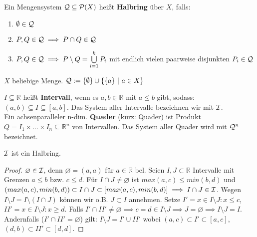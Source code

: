 \documentclass[11pt,a4paper,fleqn,openany]{report}
\begin{document}
    \begin{definition}
      Ein Mengensystem $\mathcal{Q} \subseteq \mathcal{P}(X)$ heißt \textbf{Halbring} über $X$, falls:
      \begin{enumerate}[label=\roman*)]
        \item $\emptyset \in \mathcal{Q}$
        \item $P, Q \in \mathcal{Q} \implies P \cap Q \in \mathcal{Q}$
        \item $P, Q \in \mathcal{Q} \implies P \setminus Q = \bigcup\limits_{i=1}^k P_i$ mit endlich vielen paarweise disjunkten $P_i \in \mathcal{Q}$
      \end{enumerate}
    \end{definition}

    \begin{example}
      $X$ beliebige Menge. $\mathcal{Q} := \{\emptyset\} \cup \{\{a\} \ | \ a \in X\}$
    \end{example}

    \begin{remark}
      $I \subseteq \mathbb{R}$ heißt \textbf{Intervall}, wenn es $a,b \in \mathbb{R}$ mit $a \leq b$ gibt, sodass: $(a,b) \subseteq I \subseteq [a,b]$. Das System aller Intervalle bezeichnen wir mit $\mathcal{I}$.\\
      Ein achsenparalleler n-dim. \textbf{Quader} (kurz: Quader) ist Produkt $Q = I_1 \times ... \times I_n \subseteq \mathbb{R}^n$ von Intervallen. Das System aller Quader wird mit $\mathcal{Q}^n$ bezeichnet.
    \end{remark}

    \begin{theorem}[i.A. II.19]
      $\mathcal{I}$ ist ein Halbring.
    \end{theorem}

    \begin{proof}
      $\varnothing \in \mathcal{I}$, denn $\varnothing = (a,a)$ für $a \in \mathbb{R}$ bel. Seien $I,J \subset \mathbb{R}$ Intervalle mit Grenzen $a \leq b$ bzw. $c \leq d$. Für $I \cap J \neq \varnothing$ ist $max(a,c) \leq min(b,d)$ und $(max(a,c), min(b,d)) \subset I\cap J \subset [max(a,c), min(b,d)] \implies I\cap J \in \mathcal{I}$. \newline
  	  Wegen $I\setminus J = I\setminus (I\cap J)$ können wir o.B. $J\subset I$ annehmen. \newline Setze $I' = {x\in I\setminus J: x \leq c}$, $II' = {x\in I\setminus J: x \geq d}$. \newline
    Falls $I' \cap II' \neq \varnothing \implies c = d \in I\setminus J \implies J=\varnothing \implies I\setminus J = I$. \newline 
	Andernfalls ($I' \cap II' = \varnothing$) gilt: 
$I\setminus J = I' \cup II'$ wobei $(a,c)\subset I' \subset [a,c]$, $(d,b) \subset II' \subset [d,d]$. \end{proof}
\end{document}
